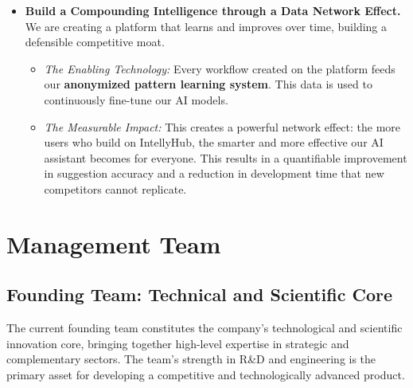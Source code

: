 \begin{itemize}
    \item \textbf{Build a Compounding Intelligence through a Data Network Effect.} We are creating a platform that learns and improves over time, building a defensible competitive moat.
    \begin{itemize}
        \item \textit{The Enabling Technology:} Every workflow created on the platform feeds our \textbf{anon\-ymized pattern learning system}. This data is used to continuously fine-tune our AI models.
        \item \textit{The Measurable Impact:} This creates a powerful network effect: the more users who build on IntellyHub, the smarter and more effective our AI assistant becomes for everyone. This results in a quantifiable improvement in suggestion accuracy and a reduction in development time that new competitors cannot replicate.
    \end{itemize}
\end{itemize}

\newpage
\section{Management Team}

\subsection{Founding Team: Technical and Scientific Core}

The current founding team constitutes the company's technological and scientific innovation core, bringing together high-level expertise in strategic and complementary sectors. The team's strength in R\&D and engineering is the primary asset for developing a competitive and technologically advanced product.


